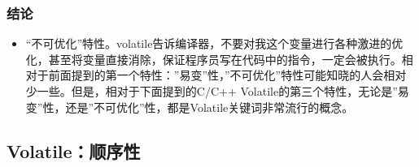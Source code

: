 \documentclass[9pt,b5paper]{article}
\begin{document}
\subsubsection{结论}
\label{sec-9-2-3}
\begin{itemize}
\item “不可优化”特性。volatile告诉编译器，不要对我这个变量进行各种激进的优化，甚至将变量直接消除，保证程序员写在代码中的指令，一定会被执行。相对于前面提到的第一个特性：”易变”性，”不可优化”特性可能知晓的人会相对少一些。但是，相对于下面提到的C/C++ Volatile的第三个特性，无论是”易变”性，还是”不可优化”性，都是Volatile关键词非常流行的概念。
\end{itemize}
\subsection{Volatile：顺序性}
\label{sec-9-3}
\end{document}
